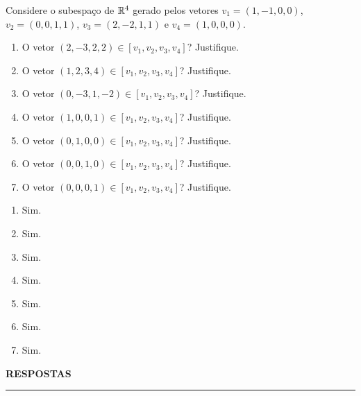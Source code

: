 \documentclass[12pt]{exam}
\begin{document}
\begin{exercicio}
  Considere o subespa\c{c}o de $\mathbb{R}^4$ gerado pelos vetores $v_1 = (1, -1, 0, 0)$, $v_2 = (0, 0, 1, 1)$, $v_3 = (2, -2, 1, 1)$ e $v_4 = (1, 0, 0, 0)$.
  \begin{enumerate}[label={\alph*})]
    \item O vetor $(2, -3, 2, 2) \in [v_1, v_2, v_3, v_4]$? Justifique.

    \item O vetor $(1, 2, 3, 4) \in [v_1, v_2, v_3, v_4]$? Justifique.

    \item O vetor $(0, -3, 1, -2) \in [v_1, v_2, v_3, v_4]$? Justifique.

    \item O vetor $(1, 0, 0, 1) \in [v_1, v_2, v_3, v_4]$? Justifique.

    \item O vetor $(0, 1, 0, 0) \in [v_1, v_2, v_3, v_4]$? Justifique.

    \item O vetor $(0, 0, 1, 0) \in [v_1, v_2, v_3, v_4]$? Justifique.

    \item O vetor $(0, 0, 0, 1) \in [v_1, v_2, v_3, v_4]$? Justifique.
  \end{enumerate}
  \begin{solucao}
    \begin{multicols}{2}
      \begin{enumerate}[label={\alph*})]
        \item Sim.
    
        \item Sim.
      
        \item Sim.

        \item Sim.

        \item Sim.

        \item Sim.

        \item Sim.
      \end{enumerate}
    \end{multicols}
  \end{solucao}
\end{exercicio}

\newpage
{}

\begin{center}
{\large\bf RESPOSTAS}
\end{center}
\hrule

\end{document}
